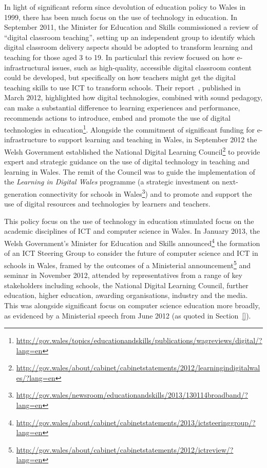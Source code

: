 \documentclass{sig-alternate}
\begin{document}

In light of significant reform since devolution of education policy to
Wales in 1999, there has been much focus on the use of technology in
education. In September 2011, the Minister for Education and Skills
commissioned a review of ``digital classroom teaching'', setting up an
independent group to identify which digital classroom delivery aspects
should be adopted to transform learning and teaching for those aged 3
to 19. In particularl this review focused on how e-infrastructural
issues, such as high-quality, accessible digital classroom content
could be developed, but specifically on how teachers might get the
digital teaching skills to use ICT to transform schools. Their
report~\cite{haywarddigwales:2012}, published in March 2012,
highlighted how digital technologies, combined with sound pedagogy,
can make a substantial difference to learning experiences and
performance, recommends actions to introduce, embed and promote the
use of digital technologies in
education\footnote{\url{http://gov.wales/topics/educationandskills/publications/wagreviews/digital/?lang=en}}. Alongside
the commitment of significant funding for e-infrastructure to support
learning and teaching in Wales, in September 2012 the Welsh Government
established the National Digital Learning Council\footnote{\url{http://gov.wales/about/cabinet/cabinetstatements/2012/learningindigitalwales/?lang=en}}
to provide expert and strategic guidance on the use of digital
technology in teaching and learning in Wales.  The remit of the
Council was to guide the implementation of the {\emph{Learning in
Digital Wales}} programme (a strategic investment on next-generation
connectivity for schools in
Wales\footnote{\url{http://gov.wales/newsroom/educationandskills/2013/130114broadband/?lang=en}})
and to promote and support the use of digital resources and
technologies by learners and teachers.


This policy focus on the use of technology in education stimulated
focus on the academic disciplines of ICT and computer science in
Wales. In January 2013, the Welsh Government's Minister for Education
and Skills
announced\footnote{\url{http://gov.wales/about/cabinet/cabinetstatements/2013/ictsteeringgroup/?lang=en}}
the formation of an ICT Steering Group to consider the future of
computer science and ICT in schools in Wales, framed by the outcomes
of a Ministerial
announcement\footnote{\url{http://gov.wales/about/cabinet/cabinetstatements/2012/ictreview/?lang=en}}
and seminar in November 2012, attended by representatives from a range
of key stakeholders including schools, the National Digital Learning
Council, further education, higher education, awarding organisations,
industry and the media. This was alongside significant focus on computer
science education more broadly, as evidenced by a Ministerial speech
from June 2012 (as quoted in Section~\ref{}).
\end{document}
